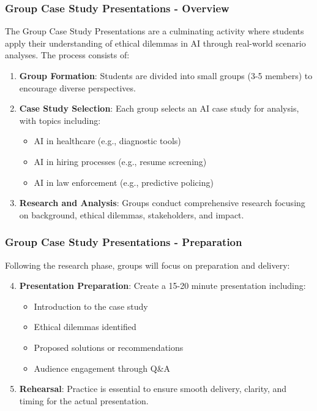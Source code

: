 \documentclass[aspectratio=169]{beamer}
\begin{document}
\begin{frame}[fragile]
    \frametitle{Group Case Study Presentations - Overview}
    The Group Case Study Presentations are a culminating activity where students apply their understanding of ethical dilemmas in AI through real-world scenario analyses. The process consists of:

    \begin{enumerate}
        \item \textbf{Group Formation}: Students are divided into small groups (3-5 members) to encourage diverse perspectives.
        \item \textbf{Case Study Selection}: Each group selects an AI case study for analysis, with topics including:
        \begin{itemize}
            \item AI in healthcare (e.g., diagnostic tools)
            \item AI in hiring processes (e.g., resume screening)
            \item AI in law enforcement (e.g., predictive policing)
        \end{itemize}
        \item \textbf{Research and Analysis}: Groups conduct comprehensive research focusing on background, ethical dilemmas, stakeholders, and impact.
    \end{enumerate}
\end{frame}

\begin{frame}[fragile]
    \frametitle{Group Case Study Presentations - Preparation}
    Following the research phase, groups will focus on preparation and delivery:

    \begin{enumerate}
        \setcounter{enumi}{3}
        \item \textbf{Presentation Preparation}: Create a 15-20 minute presentation including:
        \begin{itemize}
            \item Introduction to the case study
            \item Ethical dilemmas identified
            \item Proposed solutions or recommendations
            \item Audience engagement through Q\&A
        \end{itemize}
        \item \textbf{Rehearsal}: Practice is essential to ensure smooth delivery, clarity, and timing for the actual presentation.
    \end{enumerate}
\end{frame}
\end{document}
